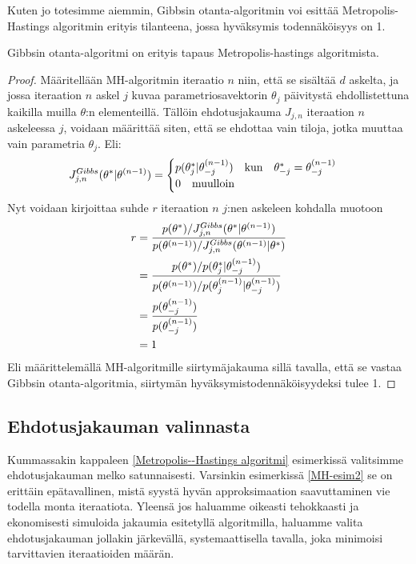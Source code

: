 Kuten jo totesimme aiemmin, Gibbsin otanta-algoritmin voi esittää Metropolis-Hastings algoritmin erityis tilanteena, jossa hyväksymis todennäköisyys on 1.

\begin{lause}
	Gibbsin otanta-algoritmi on erityis tapaus Metropolis-hastings algoritmista.
\end{lause}

\begin{proof}
	Määritellään MH-algoritmin iteraatio $n$ niin, että  se sisältää $d$ askelta, ja jossa iteraation $n$ askel $j$ kuvaa parametriosavektorin $\theta_j$ päivitystä ehdollistettuna kaikilla muilla $\theta$:n elementeillä. Tällöin ehdotusjakauma $J_{j,n}$ iteraation $n$ askeleessa $j$, voidaan määrittää siten, että se ehdottaa vain tiloja, jotka muuttaa vain parametria $\theta_j$. Eli:
	\begin{equation}
		J_{j,n}^{Gibbs}(\theta^*|\tnm)=\begin{cases}
			p(\theta^*_j|\tnm_{-j}) \qq{kun} \theta^*_{-j}=\tnm_{-j} \\
			0 \qq{muulloin}
		\end{cases}
	\end{equation}
	Nyt voidaan kirjoittaa suhde $r$ iteraation $n$ $j$:nen askeleen kohdalla muotoon
	\begin{equation}
		\begin{split}
			r &= \frac{p(\theta^*)/J_{j,n}^{Gibbs}(\theta^*|\theta^{(n-1)})}
			{p(\theta^{(n-1)})/J_{j,n}^{Gibbs}(\theta^{(n-1)}|\theta^*)} \\
			&= \frac{p(\theta^*)/p(\theta^*_j|\theta^{(n-1)}_{-j})}
			{p(\theta^{(n-1)})/p(\theta^{(n-1)}_{j}|\theta^{(n-1)}_{-j})} \\
			&= \frac{p(\theta^{(n-1)}_{-j})}{p(\theta^{(n-1)}_{-j})} \\
			&= 1
		\end{split}
	\end{equation}
	Eli määrittelemällä MH-algoritmille siirtymäjakauma sillä tavalla, että se vastaa Gibbsin otanta-algoritmia, siirtymän hyväksymistodennäköisyydeksi tulee 1.
\end{proof}

\subsection{Ehdotusjakauman valinnasta}

Kummassakin kappaleen \ref{Metropolis--Hastings algoritmi} esimerkissä valitsimme ehdotusjakauman melko satunnaisesti. Varsinkin esimerkissä \ref{MH-esim2} se on erittäin epätavallinen, mistä syystä hyvän approksimaation saavuttaminen vie todella monta iteraatiota. Yleensä jos haluamme oikeasti tehokkaasti ja ekonomisesti simuloida jakaumia esitetyllä algoritmilla, haluamme valita ehdotusjakauman jollakin järkevällä, systemaattisella tavalla, joka minimoisi tarvittavien iteraatioiden määrän.

